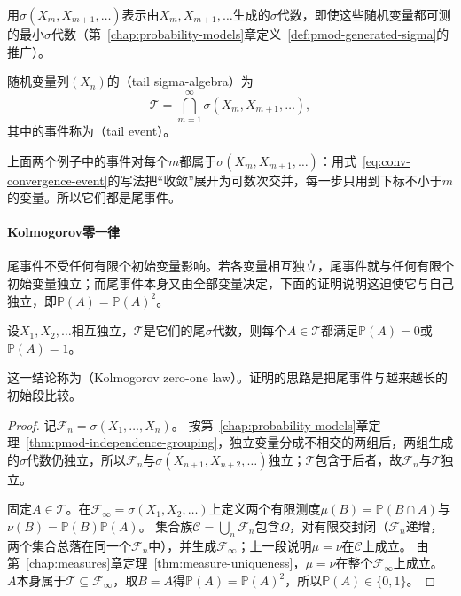 用$\sigma(X_m,X_{m+1},\ldots)$表示由$X_m,X_{m+1},\ldots$生成的$\sigma$代数，即使这些随机变量都可测的最小$\sigma$代数（第~\ref{chap:probability-models}章定义~\ref{def:pmod-generated-sigma}的推广）。

\begin{definition}[尾$\sigma$代数]
\label{def:conv-tail-sigma}
随机变量列$(X_n)$的（tail sigma-algebra）为
\[
  \mathcal T=\bigcap_{m=1}^{\infty}\sigma(X_m,X_{m+1},\ldots),
\]
其中的事件称为（tail event）。
\end{definition}

上面两个例子中的事件对每个$m$都属于$\sigma(X_m,X_{m+1},\ldots)$：用式~\eqref{eq:conv-convergence-event}的写法把“收敛”展开为可数次交并，每一步只用到下标不小于$m$的变量。所以它们都是尾事件。

\paragraph{Kolmogorov零一律}
尾事件不受任何有限个初始变量影响。若各变量相互独立，尾事件就与任何有限个初始变量独立；而尾事件本身又由全部变量决定，下面的证明说明这迫使它与自己独立，即$\mathbb P(A)=\mathbb P(A)^2$。

\begin{theorem}[Kolmogorov零一律]
\label{thm:conv-zero-one}
设$X_1,X_2,\ldots$相互独立，$\mathcal T$是它们的尾$\sigma$代数，则每个$A\in\mathcal T$都满足$\mathbb P(A)=0$或$\mathbb P(A)=1$。
\end{theorem}

这一结论称为（Kolmogorov zero-one law）。证明的思路是把尾事件与越来越长的初始段比较。

\begin{proof}
记$\mathcal F_n=\sigma(X_1,\ldots,X_n)$。
按第~\ref{chap:probability-models}章定理~\ref{thm:pmod-independence-grouping}，独立变量分成不相交的两组后，两组生成的$\sigma$代数仍独立，所以$\mathcal F_n$与$\sigma(X_{n+1},X_{n+2},\ldots)$独立；$\mathcal T$包含于后者，故$\mathcal F_n$与$\mathcal T$独立。

固定$A\in\mathcal T$。在$\mathcal F_\infty=\sigma(X_1,X_2,\ldots)$上定义两个有限测度$\mu(B)=\mathbb P(B\cap A)$与$\nu(B)=\mathbb P(B)\mathbb P(A)$。
集合族$\mathcal C=\bigcup_n\mathcal F_n$包含$\Omega$，对有限交封闭（$\mathcal F_n$递增，两个集合总落在同一个$\mathcal F_n$中），并生成$\mathcal F_\infty$；上一段说明$\mu=\nu$在$\mathcal C$上成立。
由第~\ref{chap:measures}章定理~\ref{thm:measure-uniqueness}，$\mu=\nu$在整个$\mathcal F_\infty$上成立。
$A$本身属于$\mathcal T\subseteq\mathcal F_\infty$，取$B=A$得$\mathbb P(A)=\mathbb P(A)^2$，所以$\mathbb P(A)\in\{0,1\}$。
\end{proof}

